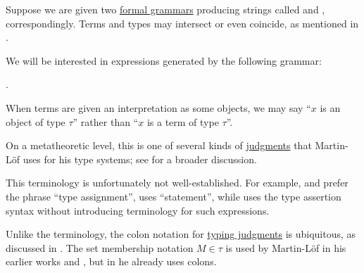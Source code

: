 \begin{definition}\label{def:type_assertion}\mimprovised
  Suppose we are given two \hyperref[def:formal_grammar/schema]{formal grammars} producing strings called  and , correspondingly. Terms and types may intersect or even coincide, as mentioned in .

  We will be interested in expressions generated by the following grammar:
  \begin{bnf*}
     { \bnfsp \bnftsq{\( : \)} \bnfsp {}}.
  \end{bnf*}
\end{definition}
\begin{comments}
  \item When terms are given an interpretation as some objects, we may say \enquote{\( x \) is an object of type \( \tau \)} rather than \enquote{\( x \) is a term of type \( \tau \)}.

  \item On a metatheoretic level, this is one of several kinds of \hyperref[con:judgment]{judgments} that Martin-L\"of uses for his type systems; see  for a broader discussion.

  \item This terminology is unfortunately not well-established. For example,  and  prefer the phrase \enquote{type assignment},  uses \enquote{statement}, while  uses the type assertion syntax without introducing terminology for such expressions.

  \item Unlike the terminology, the colon notation for \hyperref[rem:typing_judgments]{typing judgments} is ubiquitous, as discussed in \cite{MathSE:origin_of_colon_notation_for_type_assertions}. The set membership notation \( M \in \tau \) is used by Martin-L\"of in his earlier works \cite{MartinLöf1975IntuitionisticTypeTheory} and \cite{MartinLöf1984IntuitionisticTypeTheory}, but in \cite{MartinLöf1994TypeJudgments} he already uses colons.
\end{comments}

